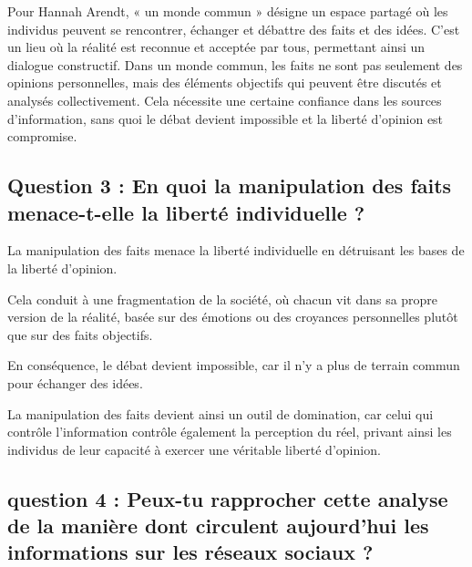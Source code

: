 \documentclass[a4paper,12pt]{article}
\begin{document}
Pour Hannah Arendt, « un monde commun » désigne un espace partagé où les individus peuvent se rencontrer, échanger et débattre des faits et des idées. C'est un lieu où la réalité est reconnue et acceptée par tous, permettant ainsi un dialogue constructif. Dans un monde commun, les faits ne sont pas seulement des opinions personnelles, mais des éléments objectifs qui peuvent être discutés et analysés collectivement. Cela nécessite une certaine confiance dans les sources d'information, sans quoi le débat devient impossible et la liberté d'opinion est compromise.

\subsection{Question 3 : En quoi la manipulation des faits menace-t-elle la liberté individuelle ?}

La manipulation des faits menace la liberté individuelle en détruisant les bases de la liberté d’opinion. 

Cela conduit à une fragmentation de la société, où chacun vit dans sa propre version de la réalité, basée sur des émotions ou des croyances personnelles plutôt que sur des faits objectifs. 

En conséquence, le débat devient impossible, car il n’y a plus de terrain commun pour échanger des idées. 

La manipulation des faits devient ainsi un outil de domination, car celui qui contrôle l’information contrôle également la perception du réel, privant ainsi les individus de leur capacité à exercer une véritable liberté d’opinion.

\subsection{question 4 : Peux-tu rapprocher cette analyse de la manière dont circulent aujourd’hui les
informations sur les réseaux sociaux ?}
\end{document}

